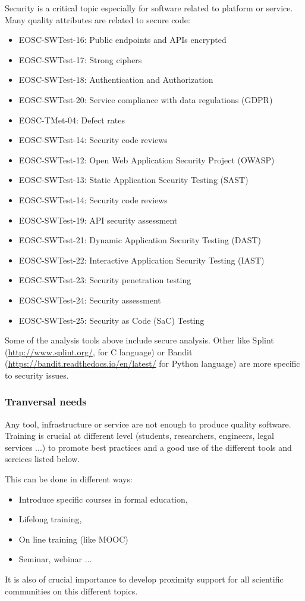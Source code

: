 Security is a critical topic especially for software related to
platform or service. Many quality attributes are related to secure code:

\begin{itemize}
  \item EOSC-SWTest-16: Public endpoints and APIs encrypted
  \item EOSC-SWTest-17: Strong ciphers
  \item EOSC-SWTest-18: Authentication and Authorization
  \item EOSC-SWTest-20: Service compliance with data regulations (GDPR)
  \item EOSC-TMet-04: Defect rates
  \item EOSC-SWTest-14: Security code reviews
  \item EOSC-SWTest-12: Open Web Application Security Project (OWASP)
  \item EOSC-SWTest-13: Static Application Security Testing (SAST)
  \item EOSC-SWTest-14: Security code reviews
  \item EOSC-SWTest-19: API security assessment
  \item EOSC-SWTest-21: Dynamic Application Security Testing (DAST)
  \item EOSC-SWTest-22: Interactive Application Security Testing (IAST)
  \item EOSC-SWTest-23: Security penetration testing
  \item EOSC-SWTest-24: Security assessment
  \item EOSC-SWTest-25: Security as Code (SaC) Testing
\end{itemize}

Some of the analysis tools above include secure analysis. Other like
Splint (\url{http://www.splint.org/}, for C language) or 
Bandit (\url{https://bandit.readthedocs.io/en/latest/} for Python
language) are more specific to security issues.

\subsubsection{Tranversal needs}

Any tool, infrastructure or service are not enough to produce quality
software. Training is crucial at different level (students,
researchers, engineers, legal services ...) to promote best practices
and a good use of the different tools and sercices listed below.

This can be done in different ways:
\begin{itemize}
\item Introduce specific courses in formal education,
\item Lifelong training,
\item On line training (like MOOC)
\item Seminar, webinar ...
\end{itemize}

It is also of crucial importance to develop proximity support for all
scientific communities on this different topics.


